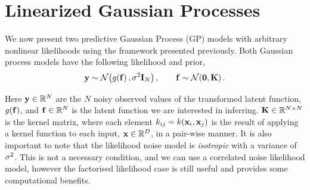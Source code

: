 \documentclass{article} %
\begin{document}
\section{Linearized Gaussian Processes}
\label{sec:gpmod}

We now present two predictive Gaussian Process (GP) models \cite{Rasmussen2006}
with arbitrary nonlinear likelihoods using the framework presented previously.
Both Gaussian process models have the following likelihood and prior,
\begin{equation}
    \mathbf{y} \sim \mathcal{N}\!\left({g\!\left({{\mathbf{f}}}\right), \sigma^2\mathbf{I}_{N}}\right), \qquad
    \mathbf{f} \sim \mathcal{N}\!\left({\mathbf{0}, \mathbf{K}}\right).
    \label{eq:gplikeprior}
\end{equation}

Here $\mathbf{y} \in \mathbb{R}^{N}$ are the $N$ noisy observed values of the transformed
latent function, $g\!\left({{\mathbf{f}}}\right)$, and $\mathbf{f} \in \mathbb{R}^{N}$ is the latent
function we are interested in inferring. $\mathbf{K} \in \mathbb{R}^{N\times N}$ is the
kernel matrix, where each element $k_{ij} = k\!\left({\mathbf{x}_i,
    \mathbf{x}_j}\right)$ is the result of applying a kernel function to each input,
$\mathbf{x} \in \mathbb{R}^{D}$, in a pair-wise manner. It is also important to note that
the likelihood noise model is \emph{isotropic} with a variance of $\sigma^2$. This
is not a necessary condition, and we can use a correlated noise likelihood
model, however the factorised likelihood case is still useful and provides some
computational benefits. 
    
\end{document}
